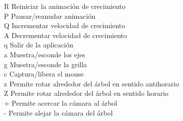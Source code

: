\documentclass[11pt]{article}
\begin{document}
R Reiniciar la animaci\'on de crecimiento \\
P Pausar/reanudar animaci\'on  \\
Q Incrementar velocidad de crecimiento  \\
A Decrementar velocidad de crecimiento  \\
q Salir de la aplicaci\'on  \\
a Muestra/esconde los ejes  \\
g Muestra/esconde la grilla  \\
c Captura/libera el mouse  \\
z Permite rotar alrededor del \'arbol en sentido antihorario  \\
Z Permite rotar alrededor del \'arbol en sentido horario  \\
+ Permite acercar la c\'amara al \'arbol  \\
- Permite alejar la c\'amara del \'arbol  \\
\end{document}
